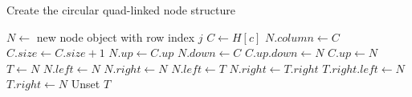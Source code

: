 \begin{algorithm}
	\caption{Create the circular quad-linked node structure}
	\label{alg:nodes}
	\begin{distribalgo}[1]
				\STATE $N \leftarrow$ new node object with row index $j$
				\STATE $C \leftarrow H[c]$
				\STATE $N.column \leftarrow C$
				\STATE $C.size \leftarrow C.size + 1$
				\STATE $N.up \leftarrow C.up$
				\STATE $N.down \leftarrow C$
				\STATE $C.up.down \leftarrow N$
				\STATE $C.up \leftarrow N$
					\STATE $T \leftarrow N$  
					\STATE $N.left \leftarrow N$
					\STATE $N.right \leftarrow N$
				\ELSE
					\STATE $N.left \leftarrow T$
					\STATE $N.right \leftarrow T.right$
					\STATE $T.right.left \leftarrow N$
					\STATE $T.right \leftarrow N$
				\ENDIF
			\ENDFOR
			\STATE Unset $T$
		\ENDFOR
	\end{distribalgo}
\end{algorithm}



